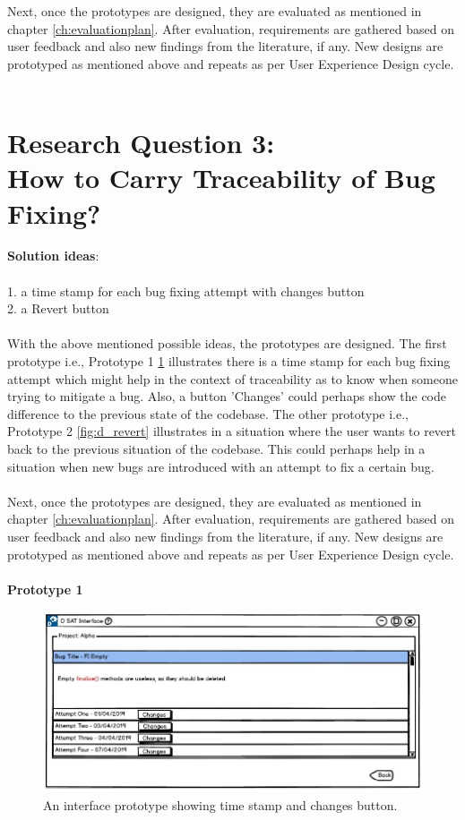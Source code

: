 Next, once the prototypes are designed, they are evaluated as mentioned in chapter \ref{ch:evaluationplan}. After evaluation, requirements are gathered based on user feedback and also new findings from the literature, if any. New designs are prototyped as mentioned above and repeats as per User Experience Design cycle. \\ \\

\section{Research Question 3:  \\ How to Carry Traceability of Bug Fixing?} 

\textbf{Solution ideas}: \\ \\
1. a time stamp for each bug fixing attempt with changes button \\
2. a Revert button \\ \\

With the above mentioned possible ideas, the prototypes are designed. The first prototype i.e., Prototype 1 \ref{fig:d_changes} illustrates there is a time stamp for each bug fixing attempt which might help in the context of traceability as to know when someone trying to mitigate a bug. Also, a button 'Changes' could perhaps show the code difference to the previous state of the codebase. The other prototype i.e., Prototype 2 \ref{fig:d_revert} illustrates in a situation where the user wants to revert back to the previous situation of the codebase. This could perhaps help in a situation when new bugs are introduced with an attempt to fix a certain bug. \\ \\

Next, once the prototypes are designed, they are evaluated as mentioned in chapter \ref{ch:evaluationplan}. After evaluation, requirements are gathered based on user feedback and also new findings from the literature, if any. New designs are prototyped as mentioned above and repeats as per User Experience Design cycle. \\ \\

\textbf{Prototype 1}
\begin{figure}[hbt!]
	\centering
	\includegraphics[width=\linewidth]{figures/d_changes}
	\caption{An interface prototype showing time stamp and changes button.}
	\label{fig:d_changes}
\end{figure}


